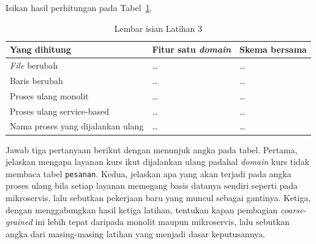 Isikan hasil perhitungan pada Tabel~\ref{tab:lat3layanan-hasil}.

\begin{table}[htbp]
  \centering
  \caption{Lembar isian Latihan 3}
  \label{tab:lat3layanan-hasil}
  \begin{tabularx}{\textwidth}{|X|l|l|}
    \hline
    \textbf{Yang dihitung} & \textbf{Fitur satu \textit{domain}} & \textbf{Skema bersama} \\
    \hline
    \textit{File} berubah & \dots & \dots \\
    \hline
    Baris berubah & \dots & \dots \\
    \hline
    Proses ulang monolit & \dots & \dots \\
    \hline
    Proses ulang service-based & \dots & \dots \\
    \hline
    Nama proses yang dijalankan ulang & \dots & \dots \\
    \hline
  \end{tabularx}
\end{table}

Jawab tiga pertanyaan berikut dengan menunjuk angka pada tabel. Pertama,
jelaskan mengapa layanan kurs ikut dijalankan ulang padahal \textit{domain} kurs tidak
membaca tabel \texttt{pesanan}. Kedua, jelaskan apa yang akan terjadi pada angka proses
ulang bila setiap layanan memegang basis datanya sendiri seperti pada
mikroservis, lalu sebutkan pekerjaan baru yang muncul sebagai gantinya.
Ketiga, dengan menggabungkan hasil ketiga latihan, tentukan kapan pembagian
\textit{coarse-grained} ini lebih tepat daripada monolit maupun mikroservis, lalu
sebutkan angka dari masing-masing latihan yang menjadi dasar keputusannya.
